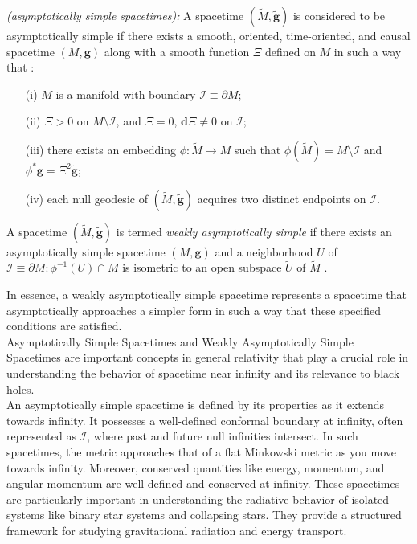 \begin{mydefinition}\label{def:asymptoticallysimple}
  \textit{(asymptotically simple spacetimes):} A spacetime $(\tilde{{M}}, \boldsymbol{\tilde{g}})$ is considered to be asymptotically simple if there exists a smooth, oriented, time-oriented, and causal spacetime  $({{M}},\boldsymbol{g})$ along with a smooth function $\Xi$ defined on ${M}$ in such a way that \cite{Ste91}:
  \begin{enumerate}
    \item[(i)] ${M}$ is a manifold with boundary $\mathcal{I} \equiv \partial {M}$;
    \item[(ii)] $\Xi > 0$ on ${M} \setminus \mathcal{I}$, and $\Xi = 0$, $\boldsymbol{d}\Xi \neq 0$ on $\mathcal{I}$;
    \item[(iii)] there exists an embedding $\phi: {\tilde{M}} \rightarrow {M}$ such that $\phi(\tilde{{M}}) = {M}\setminus \mathcal{I}$ and $\phi^{*}\boldsymbol{g} = \Xi^{2}\boldsymbol{\tilde{g}}$;
    \item[(iv)] each null geodesic of $({\tilde{M}}, \boldsymbol{\tilde{g}})$ acquires two distinct endpoints on $\mathcal{I}$.
  \end{enumerate}
\end{mydefinition}

\begin{mydefinition}\label{def:weaklyasymptoticallysimple}
  A spacetime $(\tilde{{M}}, \boldsymbol{\tilde{g}})$ is termed \textit{weakly asymptotically simple} if there exists an asymptotically simple spacetime $({M}, \boldsymbol{g})$ and a neighborhood $U$ of $\mathcal{I} \equiv \partial {M}: \phi^{-1}(U) \cap {M}$ is isometric to an open subspace $\tilde{U}$ of $\tilde{{M}}$ \cite{Val16}. 
\end{mydefinition}

In essence, a weakly asymptotically simple spacetime represents a spacetime that asymptotically approaches a simpler form in such a way that these specified conditions are satisfied.\\
Asymptotically Simple Spacetimes and Weakly Asymptotically Simple Spacetimes are important concepts in general relativity that play a crucial role in understanding the behavior of spacetime near infinity and its relevance to black holes.\\
An asymptotically simple spacetime is defined by its properties as it extends towards infinity. It possesses a well-defined conformal boundary at infinity, often represented as $\mathcal{I}$, where past and future null infinities intersect. In such spacetimes, the metric approaches that of a flat Minkowski metric as you move towards infinity. Moreover, conserved quantities like energy, momentum, and angular momentum are well-defined and conserved at infinity. These spacetimes are particularly important in understanding the radiative behavior of isolated systems like binary star systems and collapsing stars. They provide a structured framework for studying gravitational radiation and energy transport.

